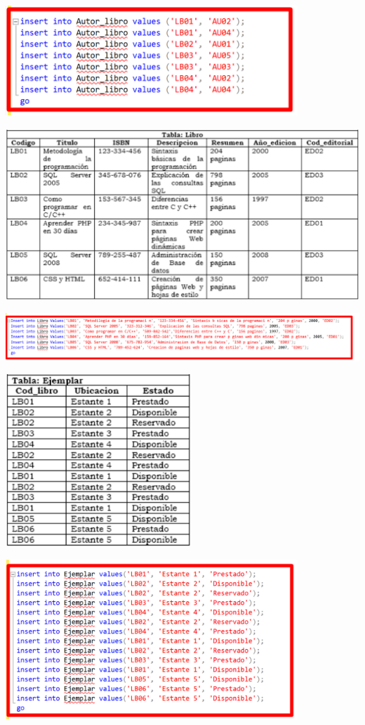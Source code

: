 \documentclass[12pt,letterpaper]{article}
\begin{document}
\begin{center}
    \includegraphics[width=11cm]{img/6.png}  
\end{center}
\begin{center}
    \includegraphics[width=14cm]{img/graph5.png}  
\end{center}
\begin{center}
    \includegraphics[width=18cm]{img/4.png}  
\end{center}
\begin{center}
    \includegraphics[width=7cm]{img/graph2.png}  
\end{center}
\begin{center}
    \includegraphics[width=11cm]{img/7.png}  
\end{center}
\end{document}
